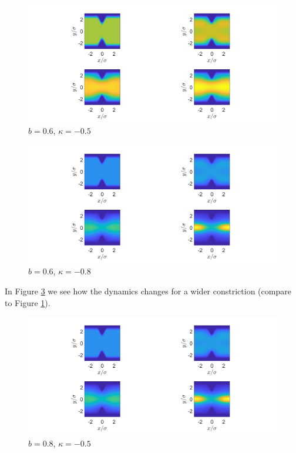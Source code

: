 \documentclass[11pt, a4paper]{article}
\theoremstyle{definition}
\begin{document}
\begin{figure}[h]
	\centering
	\includegraphics[scale=0.4]{Con2.png}
	\caption{$b = 0.6$, $\kappa =-0.5$} 
	\label{F1b}
\end{figure}
\begin{figure}[h]
	\centering
	\includegraphics[scale=0.4]{Con3.png}
	\caption{$b = 0.6$, $\kappa =-0.8$} 
	\label{F1c}
\end{figure}
In Figure \ref{F2a} we see how the dynamics changes for a wider constriction (compare to Figure \ref{F1b}).
\begin{figure}[h]
	\centering
	\includegraphics[scale=0.4]{Con3.png}
	\caption{$b = 0.8$, $\kappa =-0.5$} 
	\label{F2a}
\end{figure}
\end{document}
